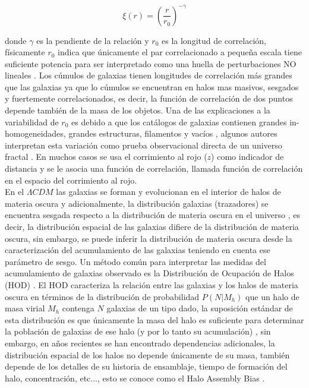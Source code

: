 \documentclass{bmcart}
\begin{document}
$$\xi(r)=\left(\frac{r}{r_0}\right)^{-\gamma}$$

donde $\gamma$ es la pendiente de la relación y $r_0$  es la longitud de 
correlación, físicamente $r_0$ indica que únicamente el par correlacionado a 
pequeña escala tiene suficiente potencia para ser interpretado como una huella 
de perturbaciones NO lineales \cite{1993A&A...280....5M}. Los cúmulos de 
galaxias tienen longitudes de correlación más grandes que las galaxias ya que 
lo cúmulos se encuentran en halos mas masivos, sesgados y fuertemente 
correlacionados, es decir, la función de correlación de dos puntos depende 
también de la masa de los objetos. Una de las explicaciones  a la variabilidad 
de $r_0$ es debido a que los catálogos de galaxias contienen grandes 
in-homogeneidades, grandes estructuras, filamentos y vacíos 
\cite{2005MNRAS.357..608Y}, algunos autores interpretan esta variación como 
prueba observacional directa de un universo fractal \cite{1987PhyA..144..257P}. 
En muchos casos se usa el corrimiento al rojo ($z$) como indicador de distancia 
y se le asocia una función de correlación, llamada función de correlación en 
el espacio del corrimiento al rojo. \\

En el $\Lambda CDM$ las galaxias se forman y evolucionan en el interior de 
halos de materia oscura y adicionalmente, la distribución galaxias (trazadores) 
se encuentra sesgada respecto a la distribución de materia oscura en el 
universo \cite{1984ApJ...284L...9K}, es decir, la distribución espacial de las 
galaxias difiere de la distribución de materia oscura, sin embargo, se puede 
inferir la distribución de materia oscura desde la caracterización del 
acumulamiento de las galaxias teniendo en cuenta ese parámetro de sesgo.  Un 
método común para interpretar las medidas del acumulamiento de galaxias 
observado es la Distribución de Ocupación de Halos (HOD) 
\cite{2000MNRAS.318..203S}\cite{2007ApJ...667..760Z}\cite{2016arXiv161001991V}. 
El HOD caracteriza la relación entre las galaxias y los halos de materia oscura 
en términos de la distribución de probabilidad $P(N|M_h)$ que un halo de masa 
virial $M_h$ contenga $N$ galaxias de un tipo dado, la suposición estándar de 
esta distribución es que únicamente la masa del halo es suficiente para 
determinar la población de galaxias de ese halo (y por lo tanto su acumulación) 
\cite{2016arXiv161001991V}\cite{2018ApJ...853...84Z}, sin embargo, en años 
recientes se han encontrado dependencias adicionales, la distribución espacial 
de los halos no depende únicamente de su masa, también depende de los detalles 
de su historia de ensamblaje, tiempo de formación del halo, concentración, 
etc..., esto se conoce como el Halo Assembly Bias 
\cite{2017ApJ...848...60Y}\cite{doi:10.1111/j.1745-3933.2007.00292.x}\cite{2005MNRAS.363L..66G}\cite{2016PhRvL.116d1301M}.\\
\end{document}
